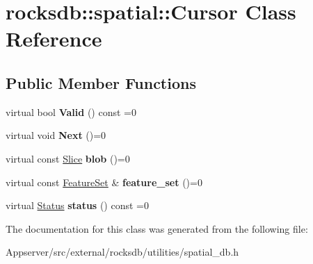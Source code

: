\hypertarget{classrocksdb_1_1spatial_1_1Cursor}{}\section{rocksdb\+:\+:spatial\+:\+:Cursor Class Reference}
\label{classrocksdb_1_1spatial_1_1Cursor}
\subsection*{Public Member Functions}
\begin{DoxyCompactItemize}
\item 
virtual bool {\bfseries Valid} () const =0\hypertarget{classrocksdb_1_1spatial_1_1Cursor_a814af270f3f0537be583c387def34a85}{}\label{classrocksdb_1_1spatial_1_1Cursor_a814af270f3f0537be583c387def34a85}

\item 
virtual void {\bfseries Next} ()=0\hypertarget{classrocksdb_1_1spatial_1_1Cursor_adffc3c8e08d5f4991083b9862561b3bd}{}\label{classrocksdb_1_1spatial_1_1Cursor_adffc3c8e08d5f4991083b9862561b3bd}

\item 
virtual const \hyperlink{classrocksdb_1_1Slice}{Slice} {\bfseries blob} ()=0\hypertarget{classrocksdb_1_1spatial_1_1Cursor_a53105d40af00f666c2adf9d7364c3b71}{}\label{classrocksdb_1_1spatial_1_1Cursor_a53105d40af00f666c2adf9d7364c3b71}

\item 
virtual const \hyperlink{classrocksdb_1_1spatial_1_1FeatureSet}{Feature\+Set} \& {\bfseries feature\+\_\+set} ()=0\hypertarget{classrocksdb_1_1spatial_1_1Cursor_aeb82ba80c3d5dc4d19e8ad08455adbb2}{}\label{classrocksdb_1_1spatial_1_1Cursor_aeb82ba80c3d5dc4d19e8ad08455adbb2}

\item 
virtual \hyperlink{classrocksdb_1_1Status}{Status} {\bfseries status} () const =0\hypertarget{classrocksdb_1_1spatial_1_1Cursor_abff34fe53160404f38165cb26d6a9a4b}{}\label{classrocksdb_1_1spatial_1_1Cursor_abff34fe53160404f38165cb26d6a9a4b}

\end{DoxyCompactItemize}


The documentation for this class was generated from the following file\+:\begin{DoxyCompactItemize}
\item 
Appserver/src/external/rocksdb/utilities/spatial\+\_\+db.\+h\end{DoxyCompactItemize}
